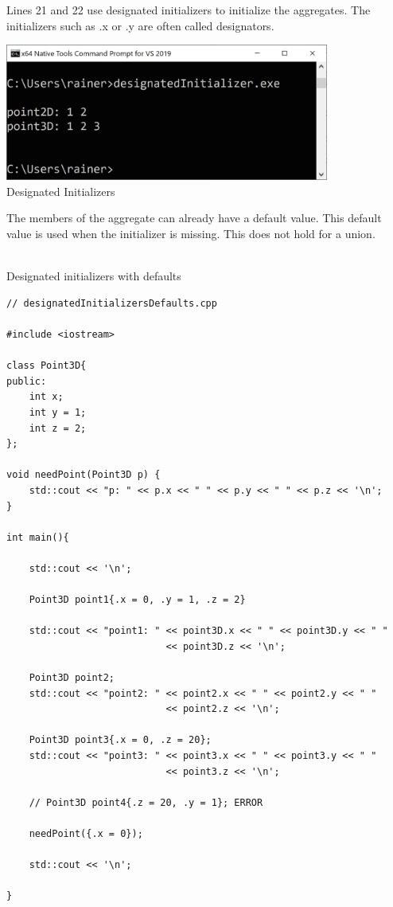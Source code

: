 Lines 21 and 22 use designated initializers to initialize the aggregates. The initializers such as .x or .y are often called designators.

\begin{center}
\includegraphics[width=0.8\textwidth]{content/3/chapter4/images/33.png}\\
Designated Initializers
\end{center}

The members of the aggregate can already have a default value. This default value is used when the initializer is missing. This does not hold for a union.

\hspace*{\fill} \\ %
\noindent
Designated initializers with defaults
\begin{lstlisting}[style=styleCXX]
// designatedInitializersDefaults.cpp

#include <iostream>

class Point3D{
public:
	int x;
	int y = 1;
	int z = 2;
};

void needPoint(Point3D p) {
	std::cout << "p: " << p.x << " " << p.y << " " << p.z << '\n';
}

int main(){
	
	std::cout << '\n';
	
	Point3D point1{.x = 0, .y = 1, .z = 2}
	
	std::cout << "point1: " << point3D.x << " " << point3D.y << " "
							<< point3D.z << '\n';
							 
	Point3D point2;		 
	std::cout << "point2: " << point2.x << " " << point2.y << " "
							<< point2.z << '\n';
				
    Point3D point3{.x = 0, .z = 20};			 
	std::cout << "point3: " << point3.x << " " << point3.y << " "
							<< point3.z << '\n';
	
	// Point3D point4{.z = 20, .y = 1}; ERROR
	
	needPoint({.x = 0});
	
	std::cout << '\n';
	
}
\end{lstlisting}

